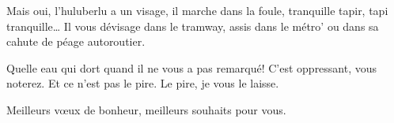   Mais oui, l’huluberlu a un visage, il marche dans la foule, tranquille tapir,
  tapi tranquille… Il vous dévisage dans le tramway, assis dans le métro’ ou dans 
  sa cahute de péage autoroutier.

  Quelle eau  qui dort quand  il ne vous  a pas remarqué!  C’est oppressant,
  vous noterez. Et ce n’est pas le pire. Le pire, je vous le laisse.

  Meilleurs vœux de bonheur, meilleurs souhaits pour vous.
